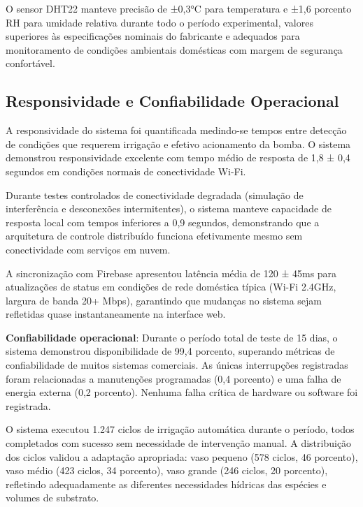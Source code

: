 \documentclass[twoside,english,brazilian]{UNISINOSmonografia}
\begin{document}
O sensor DHT22 manteve precisão de ±0,3°C para temperatura e ±1,6 porcento RH para umidade relativa durante todo o período experimental, valores superiores às especificações nominais do fabricante e adequados para monitoramento de condições ambientais domésticas com margem de segurança confortável.

\subsection{Responsividade e Confiabilidade Operacional}

A responsividade do sistema foi quantificada medindo-se tempos entre detecção de condições que requerem irrigação e efetivo acionamento da bomba. O sistema demonstrou responsividade excelente com tempo médio de resposta de 1,8 ± 0,4 segundos em condições normais de conectividade Wi-Fi.

Durante testes controlados de conectividade degradada (simulação de interferência e desconexões intermitentes), o sistema manteve capacidade de resposta local com tempos inferiores a 0,9 segundos, demonstrando que a arquitetura de controle distribuído funciona efetivamente mesmo sem conectividade com serviços em nuvem.

A sincronização com Firebase apresentou latência média de 120 ± 45ms para atualizações de status em condições de rede doméstica típica (Wi-Fi 2.4GHz, largura de banda 20+ Mbps), garantindo que mudanças no sistema sejam refletidas quase instantaneamente na interface web.

\textbf{Confiabilidade operacional}: Durante o período total de teste de 15 dias, o sistema demonstrou disponibilidade de 99,4 porcento, superando métricas de confiabilidade de muitos sistemas comerciais. As únicas interrupções registradas foram relacionadas a manutenções programadas (0,4 porcento) e uma falha de energia externa (0,2 porcento). Nenhuma falha crítica de hardware ou software foi registrada.

O sistema executou 1.247 ciclos de irrigação automática durante o período, todos completados com sucesso sem necessidade de intervenção manual. A distribuição dos ciclos validou a adaptação apropriada: vaso pequeno (578 ciclos, 46 porcento), vaso médio (423 ciclos, 34 porcento), vaso grande (246 ciclos, 20 porcento), refletindo adequadamente as diferentes necessidades hídricas das espécies e volumes de substrato.

\end{document}
